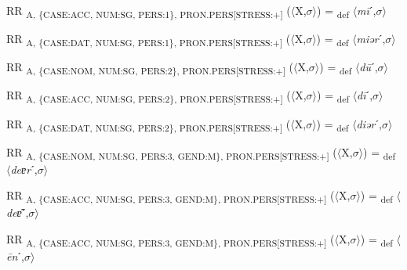 {\begin{exe}
 RR \textsubscript{A, \{CASE:ACC, NUM:SG, PERS:1\}, PRON.PERS[STRESS:+]} ($\langle$X,$\sigma $$\rangle$) = \textsubscript{def} $\langle$\textit{m\=i}ˊ,$\sigma $$\rangle$
\end{exe}

\begin{exe}
 RR \textsubscript{A, \{CASE:DAT, NUM:SG, PERS:1\}, PRON.PERS[STRESS:+]} ($\langle$X,$\sigma $$\rangle$) = \textsubscript{def} $\langle$\textit{miər}ˊ,$\sigma $$\rangle$
\end{exe}

\begin{exe}
 RR \textsubscript{A, \{CASE:NOM, NUM:SG, PERS:2\}, PRON.PERS[STRESS:+]} ($\langle$X,$\sigma $$\rangle$) = \textsubscript{def} $\langle$\textit{d\=u}ˊ,$\sigma $$\rangle$
\end{exe}

\begin{exe}
 RR \textsubscript{A, \{CASE:ACC, NUM:SG, PERS:2\}, PRON.PERS[STRESS:+]} ($\langle$X,$\sigma $$\rangle$) = \textsubscript{def} $\langle$\textit{d\=i}ˊ,$\sigma $$\rangle$
\end{exe}

\begin{exe}
 RR \textsubscript{A, \{CASE:DAT, NUM:SG, PERS:2\}, PRON.PERS[STRESS:+]} ($\langle$X,$\sigma $$\rangle$) = \textsubscript{def} $\langle$\textit{diər}ˊ,$\sigma $$\rangle$
\end{exe}

\begin{exe}
 RR \textsubscript{A, \{CASE:NOM, NUM:SG, PERS:3, GEND:M\}, PRON.PERS[STRESS:+]} ($\langle$X,$\sigma $$\rangle$) = \textsubscript{def} $\langle$\textit{deɐr}ˊ,$\sigma $$\rangle$
\end{exe}

\begin{exe}
 RR \textsubscript{A, \{CASE:ACC, NUM:SG, PERS:3, GEND:M\}, PRON.PERS[STRESS:+]} ($\langle$X,$\sigma $$\rangle$) = \textsubscript{def} $\langle$\textit{deɐ͂}ˊ,$\sigma $$\rangle$
\end{exe}

\begin{exe}
 RR \textsubscript{A, \{CASE:ACC, NUM:SG, PERS:3, GEND:M\}, PRON.PERS[STRESS:+]} ($\langle$X,$\sigma $$\rangle$) = \textsubscript{def} $\langle$\textit{\=en}ˊ,$\sigma $$\rangle$
\end{exe}

}
